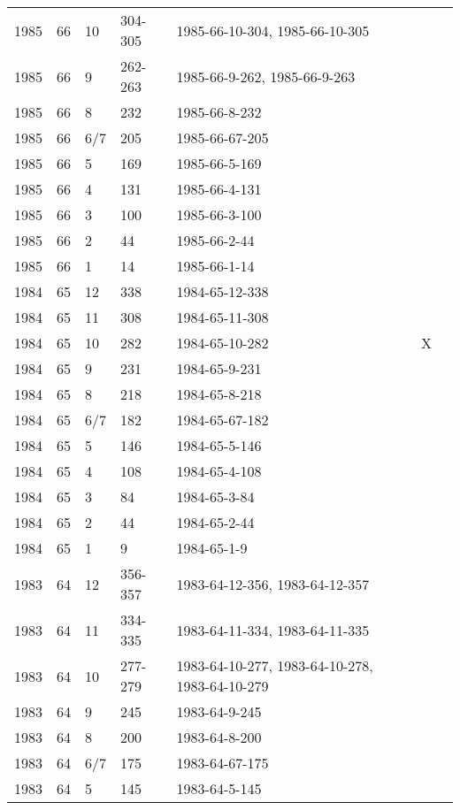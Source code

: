 \begin{longtable}{ |l|l|l|l|p{2.7cm}|l|p{2cm}| }
 1985 & 66 &    10 & 304-305 & 1985-66-10-304, 1985-66-10-305 &  & \\
 1985 & 66 &     9 & 262-263 & 1985-66-9-262, 1985-66-9-263 &  & \\
 1985 & 66 &     8 &    232  & 1985-66-8-232  &  & \\
 1985 & 66 &   6/7 &    205  & 1985-66-67-205 &  & \\
 1985 & 66 &     5 &    169  & 1985-66-5-169  &  & \\
 1985 & 66 &     4 &   131   & 1985-66-4-131  &  & \\
 1985 & 66 &     3 &   100   & 1985-66-3-100  &  & \\
 1985 & 66 &     2 &     44  & 1985-66-2-44   &  & \\
 1985 & 66 &     1 &    14   & 1985-66-1-14   &  & \\
 1984 & 65 &    12 &    338  & 1984-65-12-338 &  & \\
 1984 & 65 &    11 &    308  & 1984-65-11-308 &  & \\
 1984 & 65 &    10 &     282 & 1984-65-10-282 & X & \\
 1984 & 65 &     9 &    231  & 1984-65-9-231  &  & \\
 1984 & 65 &     8 &    218  & 1984-65-8-218  &  & \\
 1984 & 65 &   6/7 &    182  & 1984-65-67-182 &  & \\
 1984 & 65 &     5 &    146  & 1984-65-5-146  &  & \\
 1984 & 65 &     4 &    108  & 1984-65-4-108  &  & \\
 1984 & 65 &     3 &     84  & 1984-65-3-84   &  & \\
 1984 & 65 &     2 &     44  & 1984-65-2-44   &  & \\
 1984 & 65 &     1 &     9   & 1984-65-1-9    &  & \\
 1983 & 64 &    12 & 356-357 &  1983-64-12-356, 1983-64-12-357 &  & \\
 1983 & 64 &    11 & 334-335 & 1983-64-11-334, 1983-64-11-335 &  & \\
 1983 & 64 &    10 & 277-279 & 1983-64-10-277, 1983-64-10-278, 1983-64-10-279 &  & \\
 1983 & 64 &     9 &   245   & 1983-64-9-245  &  & \\
 1983 & 64 &     8 &    200  & 1983-64-8-200  &  & \\
 1983 & 64 &   6/7 &   175   & 1983-64-67-175 &  & \\
 1983 & 64 &     5 &   145   & 1983-64-5-145  &  & \\

\end{longtable}
